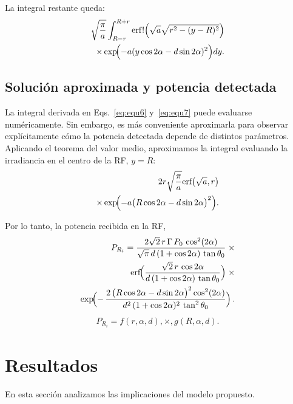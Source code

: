 \documentclass[11pt,a4paper]{article}
\begin{document}
\begin{multicols}{2}
La integral restante queda:
%
%
\begin{align}
    \sqrt{\frac{\pi}{a}}
    \int_{R-r}^{R+r}
    \mathrm{erf}!\Bigl(\sqrt{a}\sqrt{r^2 - (y - R)^2} \Bigr)\notag\\
    \times
    \exp\!\Bigl(-a(y\cos 2\alpha - d\sin 2\alpha)^2\Bigr)dy.
    \label{eq:equ7}
\end{align}
%
%
\subsection{Solución aproximada y potencia detectada}
La integral derivada en Eqs.~\eqref{eq:equ6} y~\eqref{eq:equ7} puede evaluarse numéricamente. Sin embargo, es más conveniente aproximarla para observar explícitamente cómo la potencia detectada depende de distintos parámetros. Aplicando el teorema del valor medio, aproximamos la integral evaluando la irradiancia en el centro de la RF, $y = R$:
%
%
\begin{align}
    2r\sqrt{\frac{\pi}{a}}\text{erf}\bigl(\sqrt{a},r\bigr)\notag\\
    \times
    \exp\!\Bigl(-a\bigl(R\cos 2\alpha - d\sin 2\alpha\bigr)^2\Bigr).
    \label{eq:equ8}
\end{align}
%
%

Por lo tanto, la potencia recibida en la RF,
%
%
\begin{align}
    P_{R_i}
    =
            \frac{2\sqrt{2}\,r\,\Gamma\,P_0\,\cos^2(2\alpha)}{\sqrt{\pi}\,d\,(1+\cos 2\alpha)\,\tan\theta_0}%
        \;\times\notag\\
            \mathrm{erf}\!\Bigl(
            \frac{\sqrt{2}\,r \,\cos 2\alpha}{d\,(1 + \cos 2\alpha)\,\tan \theta_0}
            \Bigr)%
    \;\times\notag\\
            \exp\!\Bigl(
            -\,\frac{2\,\bigl(R\cos 2\alpha - d\sin 2\alpha\bigr)^2 \cos^2(2\alpha)}
            {d^2\,(1 + \cos 2\alpha)^2\,\tan^2 \theta_0}%
            \Bigr)%
    \,.
    \label{eq:equ9}
\end{align}
%
%
%
%
\begin{align}
    P_{R_i} = f(r,\alpha,d),\times,g(R,\alpha,d).
    \label{eq:equ10}
\end{align}
%
%
\section{Resultados}\label{sec:5_02}
En esta sección analizamos las implicaciones del modelo propuesto.

\end{multicols}
\end{document}
